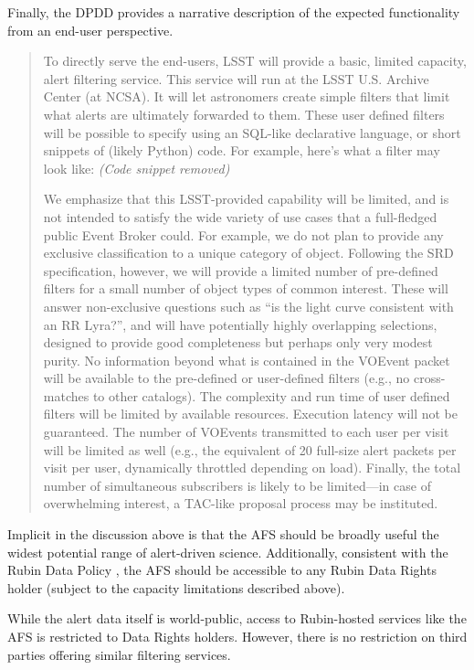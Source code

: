 \documentclass[DM,authoryear,toc]{lsstdoc}
\begin{document}
Finally, the DPDD  provides a narrative description of the expected functionality from an end-user perspective.

\begin{quote}
To directly serve the end-users, LSST will provide a basic, limited capacity, alert filtering service. 
This service will run at the LSST U.S. Archive Center (at NCSA). It will let astronomers create simple filters that limit what alerts are ultimately forwarded to them. 
These user defined
filters will be possible to specify using an SQL-like declarative language, or short snippets of
(likely Python) code. 
For example, here's what a filter may look like:
\textit{(Code snippet removed)}

We emphasize that this LSST-provided capability will be limited, and is not intended to satisfy the wide variety of use cases that a full-fledged public Event Broker could. 
For example, we do not plan to provide any exclusive classification to a unique category of object. 
Following the SRD specification, however, we will provide a limited number of pre-defined filters for a small number of object types of common interest. 
These will answer non-exclusive questions 
such as “is the light curve consistent with an RR Lyra?”, and will have potentially highly overlapping selections, designed to provide good completeness but perhaps only very modest purity.
No information beyond what is contained in the VOEvent packet will be available to the pre-defined or user-defined filters (e.g., no cross-matches to other catalogs). 
The complexity and
run time of user defined filters will be limited by available resources. 
Execution latency will
not be guaranteed. 
The number of VOEvents transmitted to each user per visit will be limited as well (e.g., the equivalent of 20 full-size alert packets per visit per user, dynamically throttled depending on load). 
Finally, the total number of simultaneous subscribers is likely to be limited---in case of overwhelming interest, a TAC-like proposal process may be instituted. 
\end{quote}

Implicit in the discussion above is that the AFS should be broadly useful the widest potential range of alert-driven science.
Additionally, consistent with the Rubin Data Policy , the AFS should be accessible to any Rubin Data Rights holder (subject to the capacity limitations described above).

While the alert data itself is world-public, access to Rubin-hosted services like the AFS is restricted to Data Rights holders.
However, there is no restriction on third parties offering similar filtering services.
\end{document}
